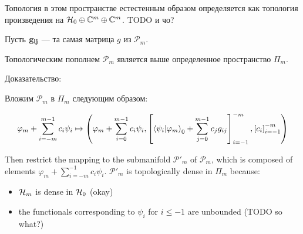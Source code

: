 Топология в этом пространстве естестенным образом определяется как топология произведения на $\mathcal{H}_{0} \oplus \mathbb{C}^m \oplus \mathbb{C}^m$. TODO и чо?

Пусть $\vb{g_{ij}}$ — та самая матрица $g$ из $\mathcal{P}_m$. 

\begin{theorem}
Топологическим пополнем $\mathcal{P}_m$ является выше определенное пространство $\Pi_m$.
\end{theorem}

Доказательство:

Вложим $\mathcal{P}_m$ в $\Pi_m$ следующим образом:

\[
\varphi_m + \sum\limits_{i = -m}^{m - 1} c_i \psi_i \mapsto
\left(
\varphi_m + \sum\limits_{i = 0}^{m - 1} c_i \psi_i,
\left[ \ip{\psi_i}{\varphi_m}_0 + \sum\limits_{j = 0}^{m - 1} c_j g_{ij} \right]_{i = -1}^{-m},
\left[ c_i \right]_{i = -1}^{-m}
\right)
\]

Then restrict the mapping to the submanifold $\mathcal{P}'_m$ of $\mathcal{P}_m$, which is composed of elements $\varphi_m + \sum\limits_{i = - m}^{-1} c_i \psi_i$. $\mathcal{P}'_m$ is topologically dense in $\Pi_m$ because:

\begin{itemize}
\item $\mathcal{H}_{m}$ is dense in $\mathcal{H}_{0}$ (okay)
\item the functionals corresponding to $\psi_i$ for $i \le -1$ are unbounded (TODO so what?)
\end{itemize}